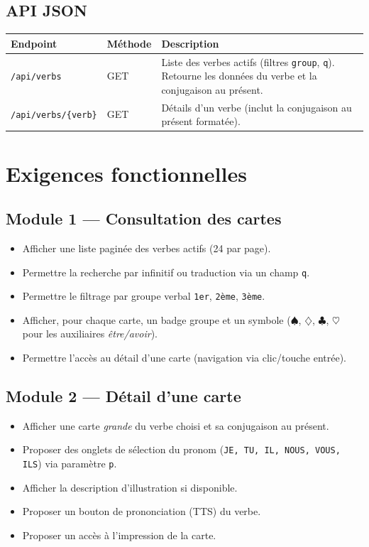 \documentclass[12pt,a4paper]{article}
\begin{document}
\subsection{API JSON}
\begin{longtable}{@{}p{5cm}p{2cm}p{7.5cm}@{}}
\toprule
\textbf{Endpoint} & \textbf{Méthode} & \textbf{Description} \\
\midrule
\endhead
\texttt{/api/verbs} & GET & Liste des verbes actifs (filtres \texttt{group}, \texttt{q}). Retourne les données du verbe et la conjugaison au présent. \\
\texttt{/api/verbs/\{verb\}} & GET & Détails d'un verbe (inclut la conjugaison au présent formatée). \\
\bottomrule
\end{longtable}

\section{Exigences fonctionnelles}

\subsection{Module 1 --- Consultation des cartes}
\begin{itemize}[leftmargin=*]
  \item Afficher une liste paginée des verbes actifs (24 par page).
  \item Permettre la recherche par infinitif ou traduction via un champ \texttt{q}.
  \item Permettre le filtrage par groupe verbal \texttt{1er}, \texttt{2ème}, \texttt{3ème}.
  \item Afficher, pour chaque carte, un badge groupe et un symbole (\(\spadesuit\), \(\diamondsuit\), \(\clubsuit\), \(\heartsuit\) pour les auxiliaires \emph{être/avoir}).
  \item Permettre l'accès au détail d'une carte (navigation via clic/touche entrée).
\end{itemize}

\subsection{Module 2 --- Détail d'une carte}
\begin{itemize}[leftmargin=*]
  \item Afficher une carte \emph{grande} du verbe choisi et sa conjugaison au présent.
  \item Proposer des onglets de sélection du pronom (\texttt{JE, TU, IL, NOUS, VOUS, ILS}) via paramètre \texttt{p}.
  \item Afficher la description d'illustration si disponible.
  \item Proposer un bouton de prononciation (TTS) du verbe.
  \item Proposer un accès à l'impression de la carte.
\end{itemize}
\end{document}
